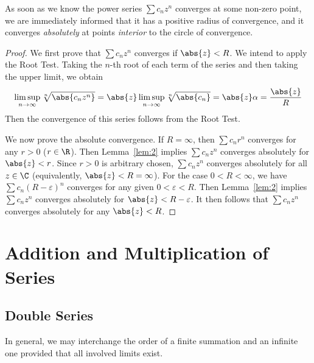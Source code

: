 \documentclass[thmcnt=section, 12pt]{elegantbook}
\begin{document}
\begin{remark}
    As soon as we know the power series $\sum c_n z^n$ converges at some non-zero point, we are immediately informed that it has a positive radius of convergence, and it converges \textit{absolutely} at points \textit{interior} to the circle of convergence.
\end{remark}

\begin{proof}
    We first prove that $\sum c_n z^n$ converges if $\abs{z} < R$. We intend to apply the Root Test. Taking the $n$-th root of each term of the series and then taking the upper limit, we obtain
    \begin{align*}
        \limsup_{n \to \infty} \sqrt[n]{\abs{c_n z^n}}
        = \abs{z} \limsup_{n \to \infty} \sqrt[n]{\abs{c_n}}
        = \abs{z} \alpha 
        = \frac{\abs{z}}{R}  
    \end{align*}
    Then the convergence of this series follows from the Root Test.

    \par We now prove the absolute convergence. If $R = \infty$, then $\sum c_n r^n$ converges for any $r > 0$ ($ r \in \R$). Then Lemma~\ref{lem:2} implies $\sum c_n z^n$ converges absolutely for $\abs{z} < r$. Since $r > 0$ is arbitrary chosen, $\sum c_n z^n$ converges absolutely for all $z \in \C$ (equivalently, $\abs{z} < R = \infty$). For the case $0 < R < \infty$, we have $\sum c_n (R - \varepsilon)^n$ converges for any given $0 < \varepsilon < R$. Then Lemma~\ref{lem:2} implies $\sum c_n z^n$ converges absolutely for $\abs{z} < R - \varepsilon$. It then follows that $\sum c_n z^n$ converges absolutely for any $\abs{z} < R$.
\end{proof}


\section{Addition and Multiplication of Series}


\subsection{Double Series}


\par In general, we may interchange the order of a finite summation and an infinite one provided that all involved limits exist.
\end{document}
